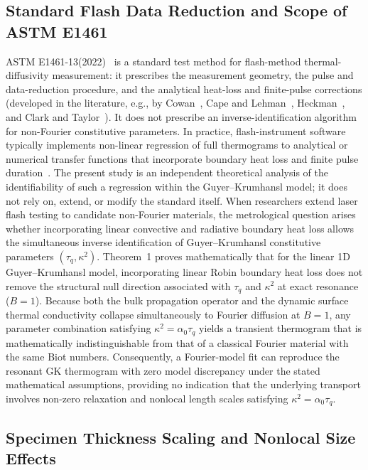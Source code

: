 \documentclass[preprint,12pt]{elsarticle}
\begin{document}
\subsection{Standard Flash Data Reduction and Scope of ASTM E1461}

ASTM E1461-13(2022)~\cite{astm2022standard} is a standard test method for flash-method thermal-diffusivity measurement: it prescribes the measurement geometry, the pulse and data-reduction procedure, and the analytical heat-loss and finite-pulse corrections (developed in the literature, e.g., by Cowan~\cite{cowan1963pulse}, Cape and Lehman~\cite{cape1963temperature}, Heckman~\cite{heckman1973finite}, and Clark and Taylor~\cite{clark1975radiation}). It does not prescribe an inverse-identification algorithm for non-Fourier constitutive parameters. In practice, flash-instrument software typically implements non-linear regression of full thermograms to analytical or numerical transfer functions that incorporate boundary heat loss and finite pulse duration~\cite{baba2001improvement,blumm2002improvement,sundar2025thermal,blumm2025laser}. The present study is an independent theoretical analysis of the identifiability of such a regression within the Guyer--Krumhansl model; it does not rely on, extend, or modify the standard itself. When researchers extend laser flash testing to candidate non-Fourier materials, the metrological question arises whether incorporating linear convective and radiative boundary heat loss allows the simultaneous inverse identification of Guyer--Krumhansl constitutive parameters $(\tau_q, \kappa^2)$. Theorem~1 proves mathematically that for the linear 1D Guyer--Krumhansl model, incorporating linear Robin boundary heat loss does not remove the structural null direction associated with $\tau_q$ and $\kappa^2$ at exact resonance ($B = 1$). Because both the bulk propagation operator and the dynamic surface thermal conductivity collapse simultaneously to Fourier diffusion at $B = 1$, any parameter combination satisfying $\kappa^2 = \alpha_0 \tau_q$ yields a transient thermogram that is mathematically indistinguishable from that of a classical Fourier material with the same Biot numbers. Consequently, a Fourier-model fit can reproduce the resonant GK thermogram with zero model discrepancy under the stated mathematical assumptions, providing no indication that the underlying transport involves non-zero relaxation and nonlocal length scales satisfying $\kappa^2 = \alpha_0 \tau_q$.

\subsection{Specimen Thickness Scaling and Nonlocal Size Effects}
\label{sec:thickness}
\end{document}

